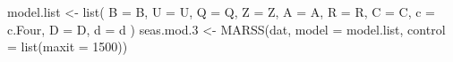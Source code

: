 \begin{Schunk}
\begin{Sinput}
 model.list <- list(
   B = B, U = U, Q = Q, Z = Z, A = A, R = R,
   C = C, c = c.Four, D = D, d = d
 )
 seas.mod.3 <- MARSS(dat, model = model.list, control = list(maxit = 1500))
\end{Sinput}
\end{Schunk}

